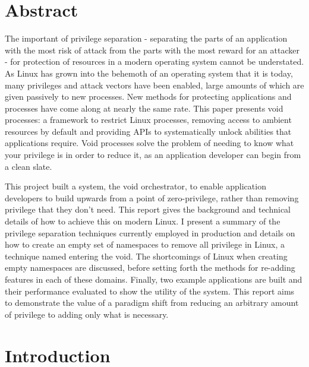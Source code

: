 \documentclass[12pt,a4paper,twoside]{report}
\begin{document}
\fi
\cleardoublepage %

\chapter*{Abstract}

The important of privilege separation - separating the parts of an application with the most risk of attack from the parts with the most reward for an attacker - for protection of resources in a modern operating system cannot be understated. As Linux has grown into the behemoth of an operating system that it is today, many privileges and attack vectors have been enabled, large amounts of which are given passively to new processes. New methods for protecting applications and processes have come along at nearly the same rate. This paper presents void processes: a framework to restrict Linux processes, removing access to ambient resources by default and providing APIs to systematically unlock abilities that applications require. Void processes solve the problem of needing to know what your privilege is in order to reduce it, as an application developer can begin from a clean slate.

This project built a system, the void orchestrator, to enable application developers to build upwards from a point of zero-privilege, rather than removing privilege that they don't need. This report gives the background and technical details of how to achieve this on modern Linux. I present a summary of the privilege separation techniques currently employed in production and details on how to create an empty set of namespaces to remove all privilege in Linux, a technique named entering the void. The shortcomings of Linux when creating empty namespaces are discussed, before setting forth the methods for re-adding features in each of these domains. Finally, two example applications are built and their performance evaluated to show the utility of the system. This report aims to demonstrate the value of a paradigm shift from reducing an arbitrary amount of privilege to adding only what is necessary.

\cleardoublepage %

\setcounter{tocdepth}{1} %
\tableofcontents

\chapter{Introduction}
\label{firstcontentpage} %
\label{chap:introduction}
\end{document}
